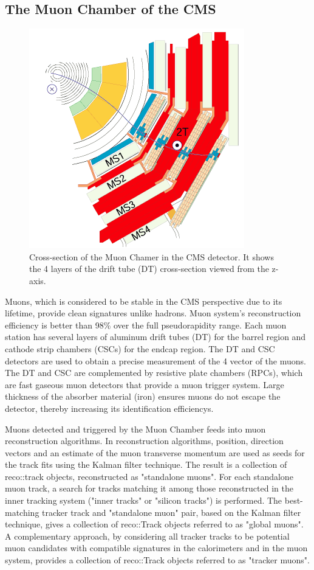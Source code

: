 \subsection{The Muon Chamber of the CMS}
\begin{figure}[h!]
	\caption{Cross-section of the Muon Chamer in the CMS detector. It shows the 4 layers of the drift tube (DT) cross-section viewed from the z-axis. \cite{det}}
  \label{fig:MC}
  \centering
  \includegraphics[width=0.4\linewidth]{figs/MCcms.png}
\end{figure}
Muons, which is considered to be stable in the CMS perspective due to its lifetime, provide clean signatures unlike hadrons.
Muon system's reconstruction efficiency is better than 98\% over the full pseudorapidity range.
Each muon station has several layers of aluminum drift tubes (DT) for the barrel region and cathode strip chambers (CSCs) for the endcap region.
The DT and CSC detectors are used to obtain a precise measurement of the 4 vector of the muons.
The DT and CSC are complemented by resistive plate chambers (RPCs), which are fast gaseous muon detectors that provide a muon trigger system. 
Large thickness of the absorber material (iron) ensures muons do not escape the detector, thereby increasing its identification efficiencys. 

Muons detected and triggered by the Muon Chamber feeds into muon reconstruction algorithms.
In reconstruction algorithms, position, direction vectors and an estimate of the muon transverse momentum are used as seeds for the track fits using the Kalman filter technique. 
The result is a collection of reco::track objects, reconstructed as "standalone muons".
For each standalone muon track, a search for tracks matching it among those reconstructed in the inner tracking system ("inner tracks" or "silicon tracks")  is performed.
The best-matching tracker track and "standalone muon" pair, based on the Kalman filter technique, gives a collection of reco::Track objects referred to as "global muons". 
A complementary approach, by considering all tracker tracks to be potential muon candidates with compatible signatures in the calorimeters and in the muon system, provides a collection of reco::Track objects referred to as "tracker muons". 

